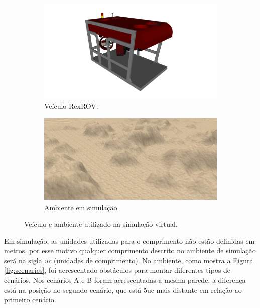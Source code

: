 \begin{figure}[H]
    \centering
    \begin{subfigure}[t]{0.4\textwidth}
        \includegraphics[width=\textwidth]{dados/figuras/rexrov.png}
        \caption{Veículo RexROV.}
        \label{fig:rexrov}
    \end{subfigure}
    \hspace{1em}
    \begin{subfigure}[t]{0.55\textwidth}
        \includegraphics[width=\textwidth]{dados/figuras/environment.png}
        \caption{Ambiente em simulação.}
        \label{fig:environment}
    \end{subfigure}
    \caption{Veículo e ambiente utilizado na simulação virtual.}
    \label{fig:simulation}
\end{figure}

Em simulação, as unidades utilizadas para o comprimento não estão definidas em metros, por esse motivo qualquer comprimento descrito no ambiente de simulação será na sigla \textit{uc} (unidades de comprimento).
No ambiente, como mostra a Figura \ref{fig:scenaries}, foi acrescentado obstáculos para montar diferentes tipos de cenários.
Nos cenários A e B foram acrescentadas a mesma parede, a diferença está na posição no segundo cenário, que está 5uc mais distante em relação ao primeiro cenário.

